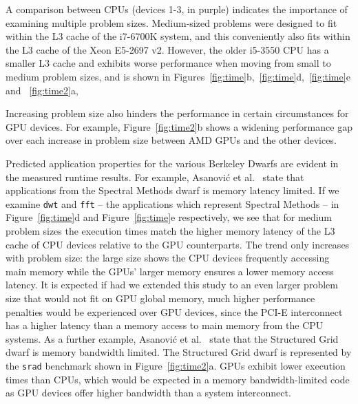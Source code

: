 \documentclass[../document.tex]{subfiles}
\begin{document}
A comparison between CPUs (devices 1-3, in purple) indicates the importance of examining multiple problem sizes.
Medium-sized problems were designed to fit within the L3 cache of the i7-6700K system, and this conveniently also fits within the L3 cache of the Xeon E5-2697 v2.
However, the older i5-3550 CPU has a smaller L3 cache and exhibits worse performance when moving from small to medium problem sizes, and is shown in Figures~\ref{fig:time}b,~\ref{fig:time}d,~\ref{fig:time}e and ~\ref{fig:time2}a,

Increasing problem size also hinders the performance in certain circumstances for GPU devices.
For example, Figure~\ref{fig:time2}b shows a widening performance gap over each increase in problem size between AMD GPUs and the other devices.

Predicted application properties for the various Berkeley Dwarfs are evident in the measured runtime results.
For example, Asanovi\'{c} et al.~\cite{asanovic2006landscape} state that applications from the Spectral Methods dwarf is memory latency limited.
If we examine {\tt dwt} and {\tt fft} -- the applications which represent Spectral Methods -- in Figure~\ref{fig:time}d and Figure~\ref{fig:time}e respectively, we see that for medium problem sizes the execution times match the higher memory latency of the L3 cache of CPU devices relative to the GPU counterparts.
The trend only increases with problem size: the large size shows the CPU devices frequently accessing main memory while the GPUs' larger memory ensures a lower memory access latency.
It is expected if had we extended this study to an even larger problem size that would not fit on GPU global memory, much higher performance penalties would be experienced over GPU devices, since the PCI-E interconnect has a higher latency than a memory access to main memory from the CPU systems.
As a further example, Asanovi\'{c} et al.~\cite{asanovic2006landscape} state that the Structured Grid dwarf is memory bandwidth limited.
The Structured Grid dwarf is represented by the {\tt srad} benchmark shown in Figure~\ref{fig:time2}a.
GPUs exhibit lower execution times than CPUs, which would be expected in a memory bandwidth-limited code as GPU devices offer higher bandwidth than a system interconnect.

\end{document}
